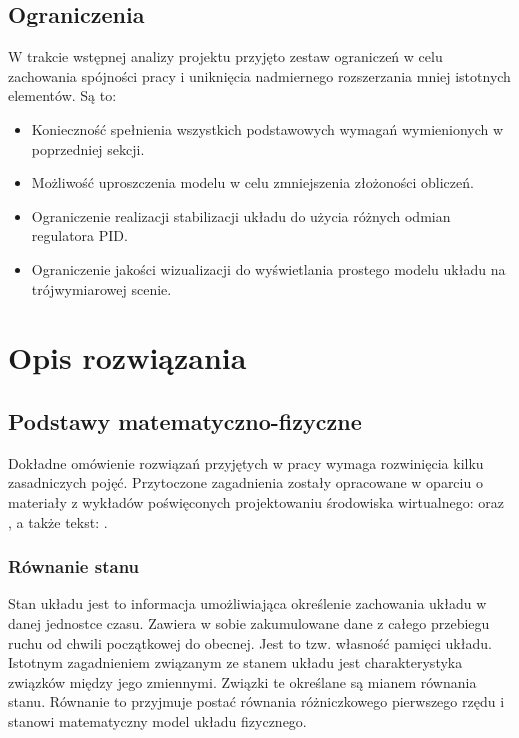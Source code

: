 \documentclass[12pt, oneside]{report}
\theoremstyle{definition}
\begin{document}
\section{Ograniczenia}
W trakcie wstępnej analizy projektu przyjęto zestaw ograniczeń w celu zachowania spójności pracy i uniknięcia nadmiernego rozszerzania mniej istotnych elementów. Są to:
\begin{itemize}
\item Konieczność spełnienia wszystkich podstawowych wymagań wymienionych w poprzedniej sekcji.
\item Możliwość uproszczenia modelu w celu zmniejszenia złożoności obliczeń.
\item Ograniczenie realizacji stabilizacji układu do użycia różnych odmian regulatora PID.
\item Ograniczenie jakości wizualizacji do wyświetlania prostego modelu układu na trójwymiarowej scenie.
\end{itemize}

\newpage
\chapter{Opis rozwiązania}
\section{Podstawy matematyczno-fizyczne}
Dokładne omówienie rozwiązań przyjętych w pracy wymaga rozwinięcia kilku zasadniczych pojęć. Przytoczone zagadnienia zostały opracowane w oparciu o materiały z wykładów poświęconych projektowaniu środowiska wirtualnego: \cite{MarciniakControlSystems} oraz \cite{MarciniakClosedLoop}, a także tekst: \cite{RungeKutta}.

\subsection{Równanie stanu}
Stan układu jest to informacja umożliwiająca określenie zachowania układu w danej jednostce czasu. Zawiera w sobie zakumulowane dane z całego przebiegu ruchu od chwili początkowej do obecnej. Jest to tzw. własność pamięci układu. Istotnym zagadnieniem związanym ze stanem układu jest charakterystyka związków między jego zmiennymi. Związki te określane są mianem równania stanu. Równanie to przyjmuje postać równania różniczkowego pierwszego rzędu i stanowi matematyczny model układu fizycznego.
\end{document}
